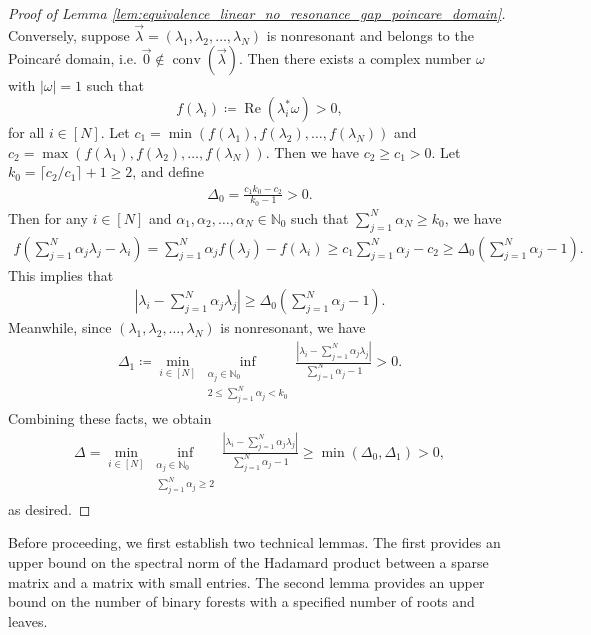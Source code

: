 \documentclass[superscriptaddress,onecolumn,nofootinbib,longbibliography,a4paper,accepted=2026-09-29]{quantumarticle}
\theoremstyle{plain}
\theoremstyle{definition}
\numberwithin{thm}{section}
\numberwithin{assumption}{section}
\numberwithin{lemma}{section}
\numberwithin{prop}{section}
\numberwithin{cor}{section}
\numberwithin{definition}{section}
\numberwithin{rmk}{section}
\numberwithin{equation}{section}
\newcommand{\abs}[1]      {\left| #1 \right|}
\newcommand{\myN}{\mathbb{N}}
\newcommand{\lrb}[1]{\left ( #1 \right )}
\newcommand{\defeq}{\coloneqq}
\newcommand{\realpart}[1]{\operatorname{Re}\lrb{#1}}
\newcommand{\mymax}[1]{\operatorname{max}\lrb{#1}}
\newcommand{\mymin}[1]{\operatorname{min}\lrb{#1}}
\begin{document}
\begin{proof}[Proof of Lemma \ref{lem:equivalence_linear_no_resonance_gap_poincare_domain}]
Conversely, suppose $\vec\lambda=(\lambda_1, \lambda_2, \dots, \lambda_N)$ is nonresonant and belongs to the Poincar\'{e} domain, i.e. 
$\vec{0} \not\in \operatorname{conv}(\vec \lambda)$. Then there exists a complex number $\omega$ with $\abs{\omega}=1$ such that 
$$f(\lambda_i)\defeq \realpart{\lambda_i^*\omega} > 0, $$
for all $i \in [N]$. Let $c_1=\mymin{f(\lambda_1),f(\lambda_2),\dots,f(\lambda_N)}$
and
$c_2=\mymax{f(\lambda_1),f(\lambda_2),\dots,f(\lambda_N)}$. Then we have $c_2 \ge c_1>0$. Let $k_0=\lceil c_2/c_1 \rceil + 1 \ge 2$, and define 
\begin{align}
\Delta_0=\frac{c_1k_0-c_2}{k_0-1}>0.    
\end{align}
Then for any $i\in [N]$ and  $\alpha_1,\alpha_2,\dots,\alpha_N \in \myN_0$ such that $\sum_{j=1}^N \alpha_N \ge k_0$, we have
\begin{align}
    f \lrb{\sum_{j=1}^N \alpha_j \lambda_{j} - \lambda_i}
    = \sum_{j=1}^N \alpha_j f(\lambda_{j}) - f(\lambda_i)
    \ge c_1 \sum_{j=1}^N \alpha_j - c_2 
    \ge \Delta_0\lrb{\sum_{j=1}^N \alpha_j-1}.
\end{align}
This implies that
\begin{align}
    \abs{\lambda_i-\sum_{j=1}^N \alpha_j\lambda_j} \ge \Delta_0\lrb{\sum_{j=1}^N \alpha_j-1}.    
\end{align}
Meanwhile, since $(\lambda_1, \lambda_2, \dots, \lambda_N)$ is nonresonant, we have 
\begin{align}
    \Delta_1 \defeq  \min_{i \in [N]} \inf_{\substack{\alpha_j \in \myN_0 \\ 2 \le \sum_{j=1}^N \alpha_j < k_0}} \frac{\abs{\lambda_i-\sum_{j=1}^N \alpha_j\lambda_j}}{\sum_{j=1}^N \alpha_j-1} > 0.
\end{align}
Combining these facts, we obtain
\begin{align}
    \Delta=\min_{i \in [N]} \inf_{\substack{\alpha_j \in \myN_0 \\ \sum_{j=1}^N \alpha_j \ge 2}} \frac{\abs{\lambda_i-\sum_{j=1}^N \alpha_j\lambda_j}}{\sum_{j=1}^N \alpha_j-1} \ge \mymin{\Delta_0, \Delta_1} > 0,    
\end{align}
as desired. 
\end{proof}

Before proceeding, we first establish two technical lemmas. The first provides an upper bound on the spectral norm of the Hadamard product between a sparse matrix and a matrix with small entries. The second lemma provides an upper bound on the number of binary forests with a specified number of roots and leaves.
\end{document}
